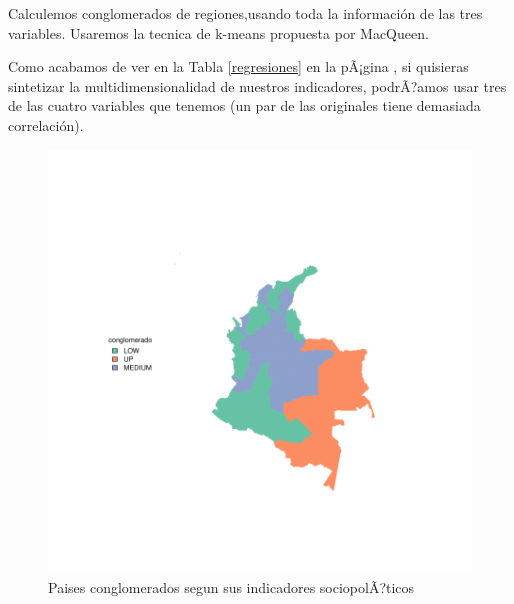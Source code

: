 \documentclass{article}
\begin{document}
Calculemos conglomerados de regiones,usando toda la información de las tres variables.
Usaremos la tecnica de k-means propuesta por MacQueen.\cite{reynolds_clustering_2006}

Como acabamos de ver en la Tabla \ref{regresiones} en la pÃ¡gina \pageref{regresiones}, si quisieras sintetizar la multidimensionalidad de nuestros indicadores, podrÃ?amos usar tres de las cuatro variables que tenemos (un par de las originales tiene demasiada correlación). 
 
% 

% 
% 


% 
% 
% 
\begin{figure}[h]
\centering
\includegraphics{EntregaFinal-plotMap1}

\caption{Paises conglomerados segun sus indicadores sociopolÃ?ticos}\label{clustmap}
\end{figure}
% 

\renewcommand{\refname}{Bibliography}

\end{document}
